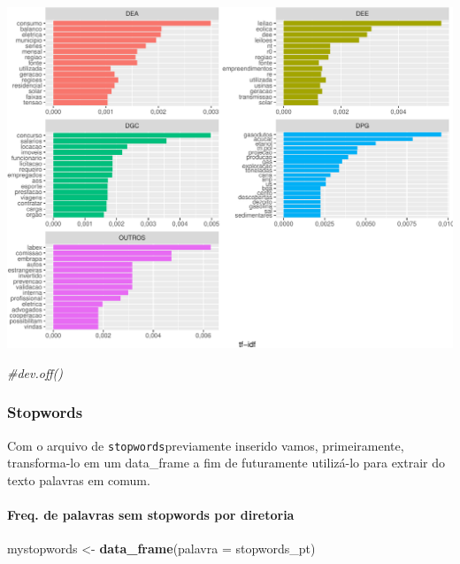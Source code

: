 \documentclass[]{article}
\newenvironment{Shaded}{\begin{snugshade}}{\end{snugshade}}
\newcommand{\KeywordTok}[1]{\textcolor[rgb]{0.13,0.29,0.53}{\textbf{#1}}}
\newcommand{\DataTypeTok}[1]{\textcolor[rgb]{0.13,0.29,0.53}{#1}}
\newcommand{\StringTok}[1]{\textcolor[rgb]{0.31,0.60,0.02}{#1}}
\newcommand{\CommentTok}[1]{\textcolor[rgb]{0.56,0.35,0.01}{\textit{#1}}}
\newcommand{\NormalTok}[1]{#1}
\let\oldparagraph\paragraph
\renewcommand{\paragraph}[1]{\oldparagraph{#1}\mbox{}}
\begin{document}
\includegraphics{markdown_v30_files/figure-latex/unnamed-chunk-42-1.pdf}

\begin{Shaded}
\begin{Highlighting}[]
\CommentTok{#dev.off()}
\end{Highlighting}
\end{Shaded}

\subsubsection{Stopwords}\label{stopwords}

Com o arquivo de \texttt{stopwords}previamente inserido vamos,
primeiramente, transforma-lo em um data\_frame a fim de futuramente
utilizá-lo para extrair do texto palavras em comum.

\paragraph{\texorpdfstring{Freq. de palavras sem \textbf{stopwords} por
diretoria}{Freq. de palavras sem stopwords por diretoria}}\label{freq.-de-palavras-sem-stopwords-por-diretoria}

\begin{Shaded}
\begin{Highlighting}[]
\NormalTok{mystopwords <-}\StringTok{ }\KeywordTok{data_frame}\NormalTok{(}\DataTypeTok{palavra =}\NormalTok{ stopwords_pt)}
\end{Highlighting}
\end{Shaded}
\end{document}
